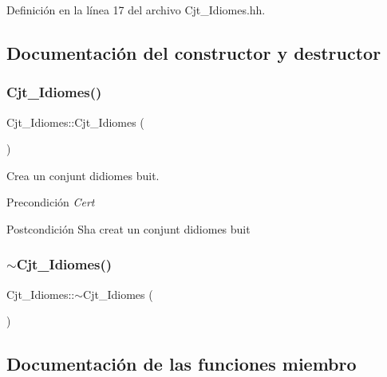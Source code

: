Definición en la línea 17 del archivo Cjt\+\_\+\+Idiomes.\+hh.



\subsection{Documentación del constructor y destructor}
\mbox{\label{class_cjt___idiomes_af77cbc534e3e83142a818314f5c24ae3}} 
\subsubsection{\texorpdfstring{Cjt\+\_\+\+Idiomes()}{Cjt\_Idiomes()}}
{\footnotesize\ttfamily Cjt\+\_\+\+Idiomes\+::\+Cjt\+\_\+\+Idiomes (\begin{DoxyParamCaption}{ }\end{DoxyParamCaption})}



Crea un conjunt d\textquotesingle{}idiomes buit. 

\begin{DoxyPrecond}{Precondición}
{\itshape Cert} 
\end{DoxyPrecond}
\begin{DoxyPostcond}{Postcondición}
S\textquotesingle{}ha creat un conjunt d\textquotesingle{}idiomes buit 
\end{DoxyPostcond}
\mbox{\label{class_cjt___idiomes_ab36517bd1824e0f00cab6cf724b6ad6f}} 
\subsubsection{\texorpdfstring{$\sim$\+Cjt\+\_\+\+Idiomes()}{~Cjt\_Idiomes()}}
{\footnotesize\ttfamily Cjt\+\_\+\+Idiomes\+::$\sim$\+Cjt\+\_\+\+Idiomes (\begin{DoxyParamCaption}{ }\end{DoxyParamCaption})}



\subsection{Documentación de las funciones miembro}
\mbox{\label{class_cjt___idiomes_a27ad0dd99449fffa904e6a757b4388ad}} 
